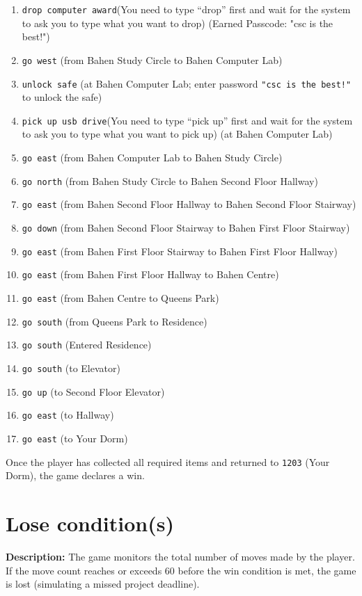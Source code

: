 \documentclass[11pt]{article}
\begin{document}
\begin{enumerate}
    \item \texttt{drop computer award}\quad (You need to type “drop” first and wait for the system to ask you to type what you want to drop) \quad (Earned Passcode: "csc is the best!")
    \item \texttt{go west} \quad (from Bahen Study Circle to Bahen Computer Lab)
    \item \texttt{unlock safe} \quad (at Bahen Computer Lab; enter password \texttt{"csc is the best!"} to unlock the safe)
    \item \texttt{pick up usb drive}\quad (You need to type “pick up” first and wait for the system to ask you to type what you want to pick up) \quad (at Bahen Computer Lab)
    \item \texttt{go east} \quad (from Bahen Computer Lab to Bahen Study Circle)
    \item \texttt{go north} \quad (from Bahen Study Circle to Bahen Second Floor Hallway)
    \item \texttt{go east} \quad (from Bahen Second Floor Hallway to Bahen Second Floor Stairway)
    \item \texttt{go down} \quad (from Bahen Second Floor Stairway to Bahen First Floor Stairway)
    \item \texttt{go east} \quad (from Bahen First Floor Stairway to Bahen First Floor Hallway)
    \item \texttt{go east} \quad (from Bahen First Floor Hallway to Bahen Centre)
    \item \texttt{go east} \quad (from Bahen Centre to Queens Park)
    \item \texttt{go south} \quad (from Queens Park to Residence)
    \item \texttt{go south} \quad (Entered Residence)
    \item \texttt{go south} \quad (to Elevator)
    \item \texttt{go up} \quad (to Second Floor Elevator)
    \item \texttt{go east} \quad (to Hallway)
    \item \texttt{go east} \quad (to Your Dorm) \quad 
\end{enumerate}


Once the player has collected all required items and returned to \texttt{1203} (Your Dorm), the game declares a win.

\section*{Lose condition(s)}
\textbf{Description:} The game monitors the total number of moves made by the player. If the move count reaches or exceeds 60 before the win condition is met, the game is lost (simulating a missed project deadline).
\end{document}
